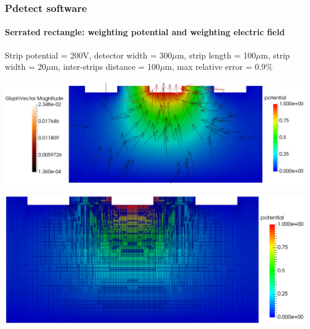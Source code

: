 \documentclass[14pt]{beamer}
\begin{document}
\begin{frame}
  \frametitle{Pdetect software}
  \framesubtitle{Serrated rectangle: weighting potential and weighting electric field}

  \fontsize{10pt}{7.2}\selectfont


  Strip potential = 200V, detector width = 300$\mu$m, strip length = 100$\mu$m, strip width = 20$\mu$m,
  inter-strips distance = 100$\mu$m, max relative error = 0.9$\%$

  \vspace{-2em}

  \begin{center}
  \includegraphics[scale=0.175]{images/serrated_pot_3_weight.png}
  \end{center}

\vspace{-2em}

  \begin{center}
  \hspace{4em} \includegraphics[scale=0.15]{images/serrated_pot_3_grid_weight.png}
  \end{center}

\end{frame}
\end{document}
